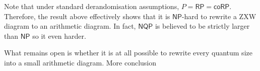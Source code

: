 Note that under standard derandomisation assumptions, $P = \mathsf{RP} = \mathsf{coRP}$. Therefore, the result above effectively shows that it is $\mathsf{NP}$-hard to rewrite a ZXW diagram to an arithmetic diagram. In fact,  $\mathsf{NQP}$ is believed to be strictly larger than $\mathsf{NP}$ so it even harder.

What remains open is whether it is at all possible to rewrite every quantum size into a small arithmetic diagram. More conclusion